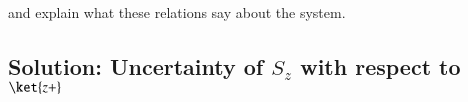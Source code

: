 and explain what these relations say about the system.

\subsection{Solution:  Uncertainty of $S_z$ with respect to $\ket{z+}$}

